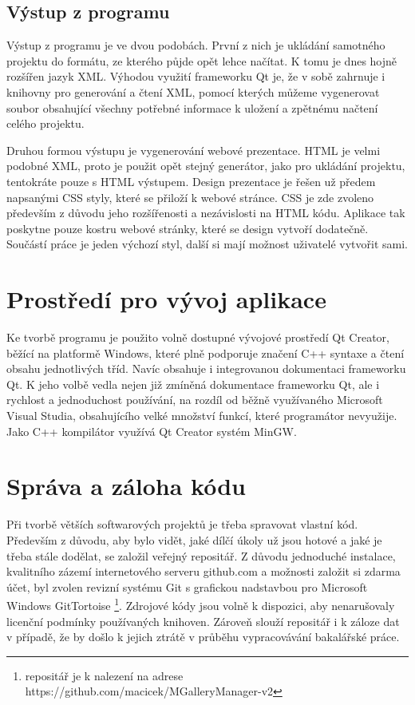 \documentclass[11pt,twoside,a4paper]{book}
\begin{document}
\subsection{Výstup z programu}
\noindent
Výstup z programu je ve dvou podobách. První z nich je ukládání samotného projektu do formátu, ze kterého půjde opět lehce načítat. K tomu je dnes hojně rozšířen jazyk XML. Výhodou využití frameworku Qt je, že v sobě zahrnuje i knihovny pro generování a čtení XML, pomocí kterých můžeme vygenerovat soubor obsahující všechny potřebné informace k uložení a zpětnému načtení celého projektu.

\indent
Druhou formou výstupu je vygenerování webové prezentace. HTML je velmi podobné XML, proto je použit opět stejný generátor, jako pro ukládání projektu, tentokráte pouze s HTML výstupem. Design prezentace je řešen už předem napsanými CSS styly, které se přiloží k webové stránce. CSS je zde zvoleno především z důvodu jeho rozšířenosti a nezávislosti na HTML kódu. Aplikace tak poskytne pouze kostru webové stránky, které se design vytvoří dodatečně. Součástí práce je jeden výchozí styl, další si mají možnost uživatelé vytvořit sami.


\section{Prostředí pro vývoj aplikace}
\noindent
Ke tvorbě programu je použito volně dostupné vývojové prostředí Qt Creator, běžící na platformě Windows, které plně podporuje značení C++ syntaxe a čtení obsahu jednotlivých tříd. Navíc obsahuje i integrovanou dokumentaci frameworku Qt. K jeho volbě vedla nejen již zmíněná dokumentace frameworku Qt\cite{qt}, ale i rychlost a jednoduchost používání, na rozdíl od běžně využívaného Microsoft Visual Studia, obsahujícího velké množství funkcí, které programátor nevyužije. Jako C++ kompilátor využívá Qt Creator systém MinGW.

\section{Správa a záloha kódu}
\noindent
Při tvorbě větších softwarových projektů je třeba spravovat vlastní kód. Především z důvodu, aby bylo vidět, jaké dílčí úkoly už jsou hotové a jaké je třeba stále dodělat, se založil veřejný repositář. Z důvodu jednoduché instalace, kvalitního zázemí internetového serveru github.com a možnosti založit si zdarma účet, byl zvolen revizní systému Git\cite{git} s grafickou nadstavbou pro Microsoft Windows GitTortoise \footnote{repositář je k nalezení na adrese https://github.com/macicek/MGalleryManager-v2}. Zdrojové kódy jsou volně k dispozici, aby nenarušovaly licenční podmínky používaných knihoven. Zároveň slouží repositář i k záloze dat v případě, že by došlo k jejich ztrátě v průběhu vypracovávání bakalářské práce.
\end{document}
